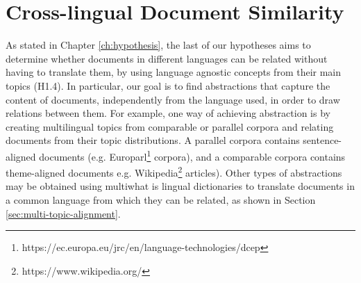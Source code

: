 

\chapter{Cross-lingual Document Similarity}\label{ch:multilinguality}

\graphicspath{{multilinguality/figures/}}



As stated in Chapter \ref{ch:hypothesis}, the last of our hypotheses aims to determine whether documents in different languages can be related without having to translate them, by using language agnostic concepts from their main topics (H1.4). In particular, our goal is to find abstractions that capture the content of documents, independently from the language used, in order to draw relations between them. For example, one way of achieving abstraction is by creating multilingual topics from comparable or parallel corpora and relating documents from their topic distributions. A parallel corpora contains sentence-aligned documents (e.g. Europarl\footnote{https://ec.europa.eu/jrc/en/language-technologies/dcep} corpora), and a comparable corpora contains theme-aligned documents e.g. Wikipedia\footnote{https://www.wikipedia.org/} articles). Other types of abstractions may be obtained using multiwhat is lingual dictionaries to translate documents in a common language from which they can be related, as shown in Section \ref{sec:multi-topic-alignment}. 

